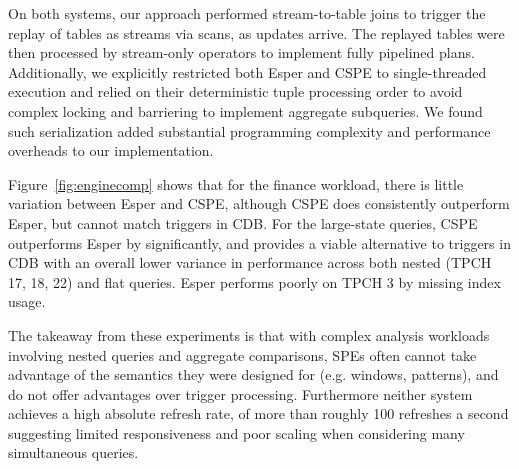 On both systems, our approach performed stream-to-table joins to trigger the
replay of tables as streams via scans, as updates arrive. The replayed tables
were then processed by stream-only operators to implement fully pipelined plans.
Additionally, we explicitly restricted both Esper and CSPE to single-threaded
execution and relied on their deterministic tuple processing order to avoid
complex locking and barriering to implement aggregate subqueries. We found such
serialization added substantial programming complexity and performance overheads
to our implementation.

Figure~\ref{fig:enginecomp} shows that for the finance workload, there is little
variation between Esper and CSPE, although CSPE does consistently outperform
Esper, but cannot match triggers in CDB. For the large-state queries, CSPE
outperforms Esper by significantly, and provides a viable alternative to
triggers in CDB with an overall lower variance in performance across both
nested (TPCH 17, 18, 22) and flat queries. Esper performs poorly on
TPCH 3 by missing index usage.

The takeaway from these experiments is that with complex analysis workloads
involving nested queries and aggregate comparisons, SPEs often cannot take
advantage of the semantics they were designed for (e.g. windows, patterns), and
do not offer advantages over trigger processing. Furthermore neither system
achieves a high absolute refresh rate, of more than roughly 100 refreshes a
second suggesting limited responsiveness and poor scaling when considering many
simultaneous queries.

